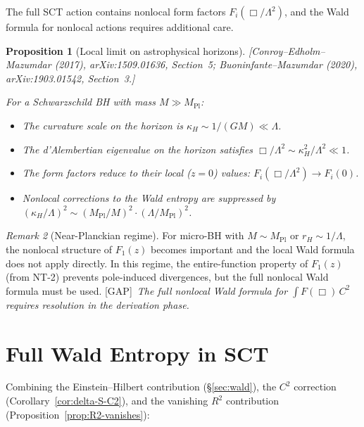 \documentclass[12pt,a4paper]{article}
\newtheorem{proposition}{Proposition}[section]
\theoremstyle{definition}
\theoremstyle{remark}
\newtheorem{remark}[proposition]{Remark}
\newcommand{\fromlit}[1]{\textcolor{blue!70!black}{\textsf{[#1]}}}
\newcommand{\gap}{\textcolor{red!80!black}{\textsf{[GAP]}}}
\begin{document}
The full SCT action contains nonlocal form factors
$F_i(\Box/\Lambda^2)$, and the Wald formula for nonlocal actions
requires additional care.

\begin{proposition}[Local limit on astrophysical horizons]
\label{prop:local-limit}
\fromlit{Conroy--Edholm--Mazumdar (2017), arXiv:1509.01636, Section~5;
Buoninfante--Mazumdar (2020), arXiv:1903.01542, Section~3.}

For a Schwarzschild BH with mass $M \gg M_{\mathrm{Pl}}$:
\begin{itemize}[nosep]
  \item The curvature scale on the horizon is
    $\kappa_H \sim 1/(GM) \ll \Lambda$.
  \item The d'Alembertian eigenvalue on the horizon satisfies
    $\Box/\Lambda^2 \sim \kappa_H^2/\Lambda^2 \ll 1$.
  \item The form factors reduce to their local ($z = 0$) values:
    $F_i(\Box/\Lambda^2) \to F_i(0)$.
  \item Nonlocal corrections to the Wald entropy are suppressed
    by $(\kappa_H/\Lambda)^2 \sim (M_{\mathrm{Pl}}/M)^2
    \cdot (\Lambda/M_{\mathrm{Pl}})^2$.
\end{itemize}
\end{proposition}

\begin{remark}[Near-Planckian regime]
For micro-BH with $M \sim M_{\mathrm{Pl}}$ or
$r_H \sim 1/\Lambda$, the nonlocal structure of $F_1(z)$
becomes important and the local Wald formula does not apply directly.
In this regime, the entire-function property of $F_1(z)$ (from NT-2)
prevents pole-induced divergences, but the full nonlocal Wald formula
must be used.  \gap\ \textit{The full nonlocal Wald formula for
$\int F(\Box)\,C^2$ requires resolution in the derivation phase.}
\end{remark}


\section{Full Wald Entropy in SCT}
\label{sec:full-wald}

Combining the Einstein--Hilbert contribution (\S\ref{sec:wald}),
the $C^2$ correction (Corollary~\ref{cor:delta-S-C2}), and the
vanishing $R^2$ contribution (Proposition~\ref{prop:R2-vanishes}):
\end{document}
